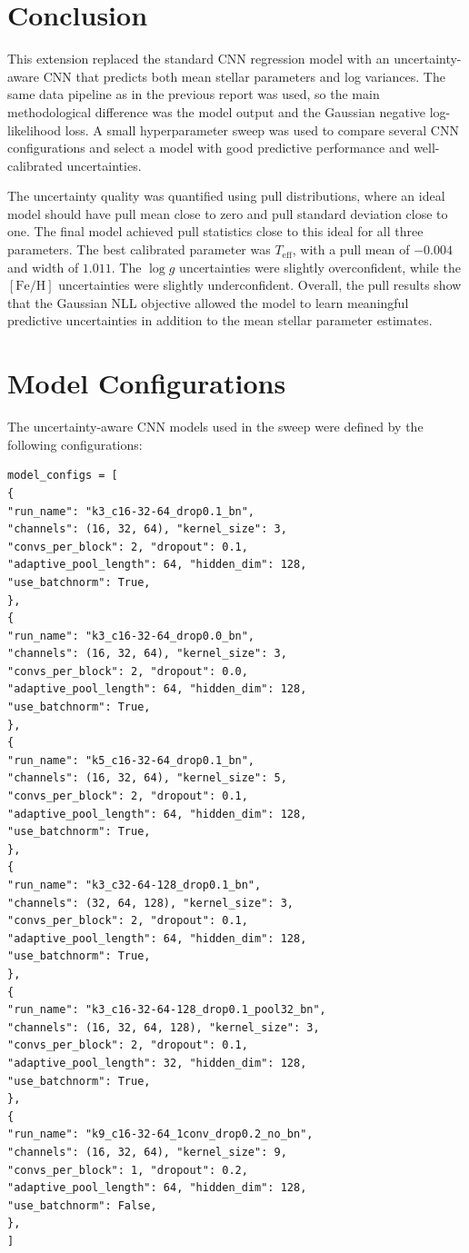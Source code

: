 \section{Conclusion}

This extension replaced the standard CNN regression model with an uncertainty-aware CNN that predicts both mean stellar parameters and log variances. 
The same data pipeline as in the previous report was used, so the main methodological difference was the model output and the Gaussian negative 
log-likelihood loss. A small hyperparameter sweep was used to compare several CNN configurations and select a model with good predictive performance 
and well-calibrated uncertainties.

The uncertainty quality was quantified using pull distributions, where an ideal model should have pull mean close to zero and pull standard deviation 
close to one. The final model achieved pull statistics close to this ideal for all three parameters. The best calibrated parameter was 
$T_{\mathrm{eff}}$, with a pull mean of $-0.004$ and width of $1.011$. The $\log g$ uncertainties were slightly overconfident, while the 
$[\mathrm{Fe/H}]$ uncertainties were slightly underconfident. Overall, the pull results show that the Gaussian NLL objective allowed the model to 
learn meaningful predictive uncertainties in addition to the mean stellar parameter estimates.

\printbibliography

\appendix

\section{Model Configurations}
\label{app:model_configs}

The uncertainty-aware CNN models used in the sweep were defined by the following configurations:

{\footnotesize
\begin{verbatim}
model_configs = [
{
"run_name": "k3_c16-32-64_drop0.1_bn",
"channels": (16, 32, 64), "kernel_size": 3,
"convs_per_block": 2, "dropout": 0.1,
"adaptive_pool_length": 64, "hidden_dim": 128,
"use_batchnorm": True,
},
{
"run_name": "k3_c16-32-64_drop0.0_bn",
"channels": (16, 32, 64), "kernel_size": 3,
"convs_per_block": 2, "dropout": 0.0,
"adaptive_pool_length": 64, "hidden_dim": 128,
"use_batchnorm": True,
},
{
"run_name": "k5_c16-32-64_drop0.1_bn",
"channels": (16, 32, 64), "kernel_size": 5,
"convs_per_block": 2, "dropout": 0.1,
"adaptive_pool_length": 64, "hidden_dim": 128,
"use_batchnorm": True,
},
{
"run_name": "k3_c32-64-128_drop0.1_bn",
"channels": (32, 64, 128), "kernel_size": 3,
"convs_per_block": 2, "dropout": 0.1,
"adaptive_pool_length": 64, "hidden_dim": 128,
"use_batchnorm": True,
},
{
"run_name": "k3_c16-32-64-128_drop0.1_pool32_bn",
"channels": (16, 32, 64, 128), "kernel_size": 3,
"convs_per_block": 2, "dropout": 0.1,
"adaptive_pool_length": 32, "hidden_dim": 128,
"use_batchnorm": True,
},
{
"run_name": "k9_c16-32-64_1conv_drop0.2_no_bn",
"channels": (16, 32, 64), "kernel_size": 9,
"convs_per_block": 1, "dropout": 0.2,
"adaptive_pool_length": 64, "hidden_dim": 128,
"use_batchnorm": False,
},
]
\end{verbatim}
}

